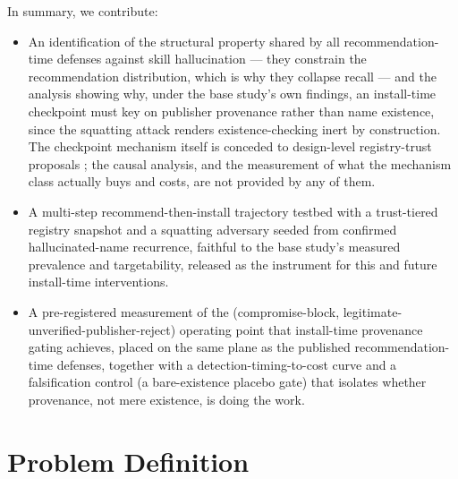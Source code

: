 \documentclass[11pt]{article}
\begin{document}
In summary, we contribute:
\begin{itemize}[leftmargin=1.4em]
\item An identification of the structural property shared by all recommendation-time defenses against skill hallucination --- they constrain the recommendation distribution, which is why they collapse recall --- and the analysis showing why, under the base study's own findings, an install-time checkpoint must key on publisher provenance rather than name existence, since the squatting attack renders existence-checking inert by construction. The checkpoint mechanism itself is conceded to design-level registry-trust proposals \citep{ztr,etdi}; the causal analysis, and the measurement of what the mechanism class actually buys and costs, are not provided by any of them.
\item A multi-step recommend-then-install trajectory testbed with a trust-tiered registry snapshot and a squatting adversary seeded from confirmed hallucinated-name recurrence, faithful to the base study's measured prevalence and targetability, released as the instrument for this and future install-time interventions.
\item A pre-registered measurement of the (compromise-block, legitimate-unverified-publisher-reject) operating point that install-time provenance gating achieves, placed on the same plane as the published recommendation-time defenses, together with a detection-timing-to-cost curve and a falsification control (a bare-existence placebo gate) that isolates whether provenance, not mere existence, is doing the work.
\end{itemize}

\section{Problem Definition}
\end{document}
